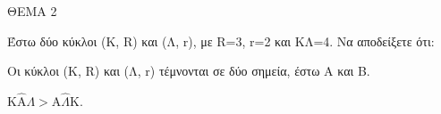 
ΘΕΜΑ 2

Έστω δύο κύκλοι (Κ, R) και (Λ, r), με R=3, r=2 και ΚΛ=4. Να αποδείξετε ότι:

\begin{alist}
\item Οι κύκλοι (Κ, R) και (Λ, r) τέμνονται σε δύο σημεία, έστω Α και Β.


\item $\text{K}\widehat{\text{A}}\Lambda > \text{A}\widehat{\Lambda}\text{K}$.

\end{alist}
